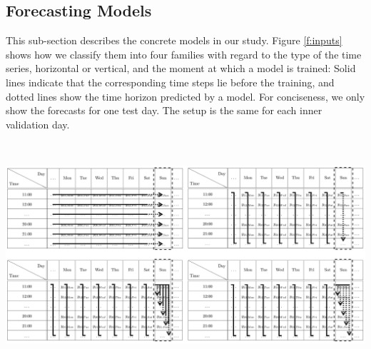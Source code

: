 \subsection{Forecasting Models}
\label{models}

This sub-section describes the concrete models in our study.
Figure \ref{f:inputs} shows how we classify them into four families with
    regard to the type of the time series, horizontal or vertical, and the
    moment at which a model is trained:
Solid lines indicate that the corresponding time steps lie before the
    training, and dotted lines show the time horizon predicted by a model.
For conciseness, we only show the forecasts for one test day.
The setup is the same for each inner validation day.

\

\begin{center}
\label{f:inputs}
\includegraphics[width=.95\linewidth]{static/model_inputs_gray.png}
\end{center}

